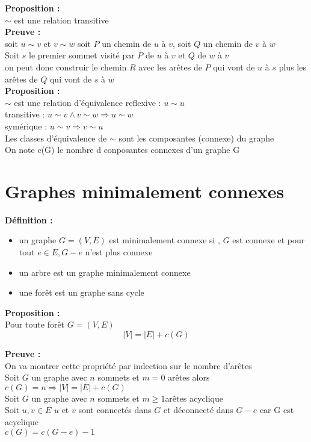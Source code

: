 \documentclass{report}
\newcommand{\deffinition}{\textcolor[rgb]{0.65,0,0.7}{Définition : }}
\newcommand{\Def}{\textbf{\deffinition}}
\newcommand{\preuve}{\textcolor[rgb]{0.95,0.25,0}{Preuve : }}
\newcommand{\Preuve}{\textbf{\preuve}}
\newcommand{\propo}{\textcolor[rgb]{0,0,0.75}{Proposition : }}
\newcommand{\Propo}{\textbf{\propo}}
\begin{document}
\Propo\\
$\sim $ est une relation transitive\\

\Preuve\\
soit $u \sim v$ et $v \sim w$ soit $P$ un chemin de $u$ à $v$, soit $Q$ un chemin de $v$ à $w$ \\
Soit $s$ le premier sommet visité par $P$ de $u$ à $v$ et $Q$ de $w$ à $v$\\
on peut donc construir le chemin $R$ avec les arêtes de $P$ qui vont de $u$ à $s$ plus les arêtes de $Q$ qui vont de $s$ à $w$\\
\newpage
\Propo\\
$\sim$ est une relation d'équivalence
reflexive : $u \sim u$\\
transitive : $u \sim v \wedge v \sim w\Rightarrow u \sim w$\\
symérique : $u \sim v\Rightarrow v \sim u$\\

Les classes d'équivalence de $\sim$ sont les composantes (connexe) du graphe\\
On note c(G) le nombre d conposantes connexes d'un graphe G\\

\section{Graphes minimalement connexes}
\Def\\
\begin{itemize}
	\item un graphe $G=(V,E)$ est minimalement connexe si , $G$ est connexe et pour tout $e \in E,G-e$ n'est plus connexe
	\item un arbre est un graphe minimalement connexe
	\item une forêt est un graphe sans cycle\\
\end{itemize}

\Propo\\
Pour toute forêt $G=(V,E)$\\
$$\left|V\right|=\left|E\right|+c(G)$$

\Preuve\\
On va montrer cette propriété par indection sur le nombre d'arêtes\\
Soit $G$ un graphe avec $n$ sommets et $m=0$ arêtes alors $c(G) =n \Rightarrow \left|V\right|=\left|E\right|+c(G)$\\
Soit $G$ un graphe avec $n$ sommets et $m\geq1$arêtes acyclique\\
Soit $u,v \in E$ $u$ et $v$ sont connectés dans $G$ et déconnecté dans $G-e$ car G est acyclique \\
$c(G) = c(G-e)-1$\\
\end{document}
